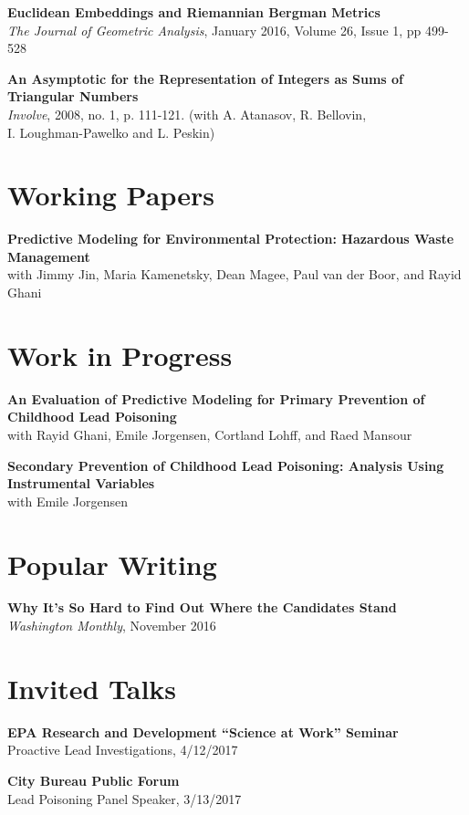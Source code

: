 \documentclass[margin,line]{resume}
\begin{document}
\begin{resume}
	{\bf Euclidean Embeddings and Riemannian Bergman Metrics} \\
        \textit{The Journal of Geometric Analysis}, January 2016, Volume 26, Issue 1, pp 499-528

	{\bf An Asymptotic for the Representation of Integers as Sums of\\Triangular Numbers} \\
        \textit{Involve}, 2008, no. 1, p. 111-121. (with A. Atanasov, R. Bellovin,\\ I. Loughman-Pawelko and L. Peskin)

        \section{\mysidestyle Working Papers}
        {\bf Predictive Modeling for Environmental Protection: Hazardous Waste Management}\\
        with Jimmy Jin, Maria Kamenetsky, Dean Magee, Paul van der Boor, and Rayid Ghani

        \section{\mysidestyle Work in Progress}
        {\bf An Evaluation of Predictive Modeling for Primary Prevention of Childhood Lead Poisoning}\\
        with Rayid Ghani, Emile Jorgensen, Cortland Lohff, and Raed Mansour

        {\bf Secondary Prevention of Childhood Lead Poisoning: Analysis Using Instrumental Variables}\\
        with Emile Jorgensen
        \section{\mysidestyle Popular Writing}
        {\bf Why It's So Hard to Find Out Where the Candidates Stand} \\
        \textit{Washington Monthly}, November 2016


	\section{\mysidestyle Invited Talks}
	{\bf EPA Research and Development ``Science at Work'' Seminar} \\
        Proactive Lead Investigations, 4/12/2017

	{\bf City Bureau Public Forum} \\
        Lead Poisoning Panel Speaker, 3/13/2017 


\end{resume}
\end{document}
